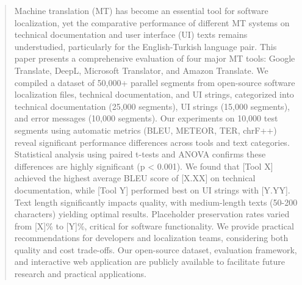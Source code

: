 \begin{abstract}
Machine translation (MT) has become an essential tool for software localization, yet the comparative performance of different MT systems on technical documentation and user interface (UI) texts remains understudied, particularly for the English-Turkish language pair. This paper presents a comprehensive evaluation of four major MT tools: Google Translate, DeepL, Microsoft Translator, and Amazon Translate. We compiled a dataset of 50,000+ parallel segments from open-source software localization files, technical documentation, and UI strings, categorized into technical documentation (25,000 segments), UI strings (15,000 segments), and error messages (10,000 segments). Our experiments on 10,000 test segments using automatic metrics (BLEU, METEOR, TER, chrF++) reveal significant performance differences across tools and text categories. Statistical analysis using paired t-tests and ANOVA confirms these differences are highly significant (p < 0.001). We found that [Tool X] achieved the highest average BLEU score of [X.XX] on technical documentation, while [Tool Y] performed best on UI strings with [Y.YY]. Text length significantly impacts quality, with medium-length texts (50-200 characters) yielding optimal results. Placeholder preservation rates varied from [X]\% to [Y]\%, critical for software functionality. We provide practical recommendations for developers and localization teams, considering both quality and cost trade-offs. Our open-source dataset, evaluation framework, and interactive web application are publicly available to facilitate future research and practical applications.
\end{abstract}
